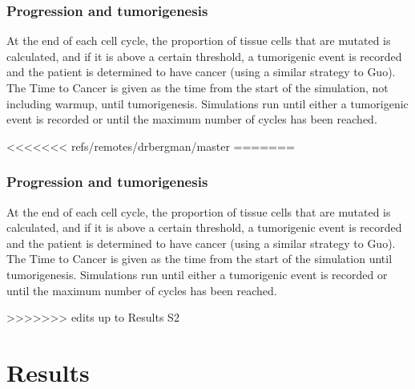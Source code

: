 \documentclass{article}
\begin{document}
\subsubsection{Progression and tumorigenesis}
At the end of each cell cycle, the proportion of tissue cells that are mutated is calculated, and if it is above a certain threshold, a tumorigenic event is recorded and the patient is determined to have cancer (using a similar strategy to Guo).
The Time to Cancer is given as the time from the start of the simulation, not including warmup, until tumorigenesis.
Simulations run until either a tumorigenic event is recorded or until the maximum number of cycles has been reached.




<<<<<<< refs/remotes/drbergman/master
=======
\subsubsection{Progression and tumorigenesis}
At the end of each cell cycle, the proportion of tissue cells that are mutated is calculated, and if it is above a certain threshold, a tumorigenic event is recorded and the patient is determined to have cancer (using a similar strategy to Guo). The Time to Cancer is given as the time from the start of the simulation until tumorigenesis. Simulations run until either a tumorigenic event is recorded or until the maximum number of cycles has been reached.

>>>>>>> edits up to Results S2


\section{Results}
\end{document}
